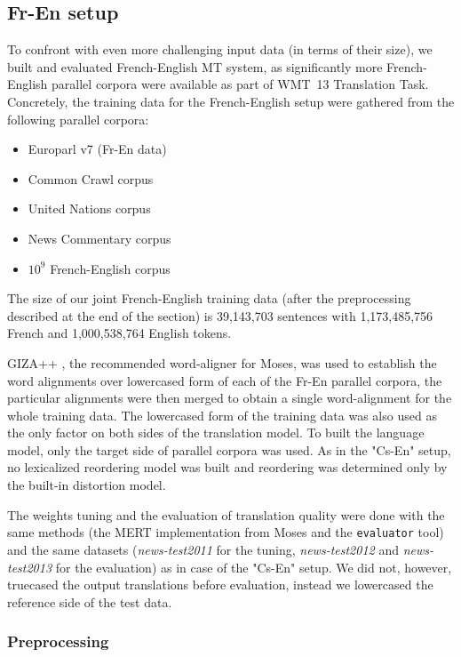\subsection{Fr-En setup}

To confront \eppex{} with even more challenging input data (in terms of their size),
we built and evaluated French-English MT system, as significantly more French-English parallel
corpora were available as part of WMT~13 Translation Task. Concretely, the training data for
the French-English setup were gathered from the following parallel corpora:
\begin{itemize}
  \item Europarl v7 (Fr-En data)
  \item Common Crawl corpus
  \item United Nations corpus
  \item News Commentary corpus
  \item $10^9$ French-English corpus
\end{itemize}
The size of our joint French-English training data (after the preprocessing described
at the end of the section) is 39,143,703 sentences with 1,173,485,756 French and 1,000,538,764
English tokens.

GIZA++ \citep{och:giza}, the recommended word-aligner for Moses,
was used to establish the word alignments over lowercased form of each
of the Fr-En parallel corpora, the particular alignments were then merged to
obtain a single word-alignment for the whole training data.
The lowercased form of the training data was also used as the only factor on both sides of
the translation model.
To built the language model, only the target side of parallel corpora was used.
As in the "Cs-En" setup, no lexicalized reordering model was built and reordering was
determined only by the built-in distortion model.

The weights tuning and the evaluation of translation quality were done with the same methods
(the MERT implementation from Moses and the \texttt{evaluator} tool) and the same datasets
(\emph{news-test2011} for the tuning, \emph{news-test2012} and \emph{news-test2013} for
the evaluation) as in case of the "Cs-En" setup. We did not, however, truecased the
output translations before evaluation, instead we lowercased the reference side of the test data.

\subsubsection*{Preprocessing}

